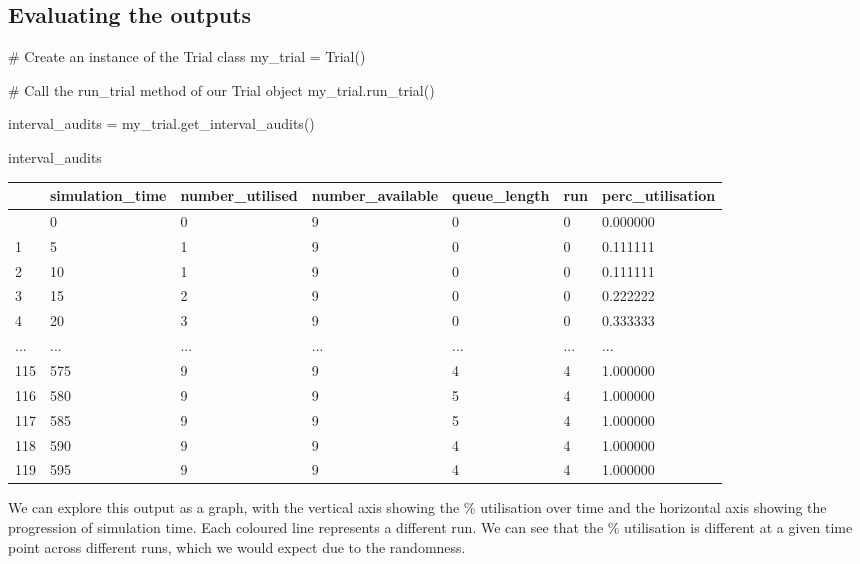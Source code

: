 \documentclass[
  letterpaper,
  DIV=11,
  numbers=noendperiod]{scrreprt}
\newenvironment{Shaded}{}{}
\newcommand{\CommentTok}[1]{\textcolor[rgb]{0.42,0.45,0.49}{#1}}
\newcommand{\NormalTok}[1]{\textcolor[rgb]{0.14,0.16,0.18}{#1}}
\newcommand{\OperatorTok}[1]{\textcolor[rgb]{0.14,0.16,0.18}{#1}}
\begin{document}
\subsection{Evaluating the outputs}\label{evaluating-the-outputs-7}

\begin{Shaded}
\begin{Highlighting}[]
\CommentTok{\# Create an instance of the Trial class}
\NormalTok{my\_trial }\OperatorTok{=}\NormalTok{ Trial()}

\CommentTok{\# Call the run\_trial method of our Trial object}
\NormalTok{my\_trial.run\_trial()}

\NormalTok{interval\_audits }\OperatorTok{=}\NormalTok{ my\_trial.get\_interval\_audits()}

\NormalTok{interval\_audits}
\end{Highlighting}
\end{Shaded}

\begin{longtable}[]{@{}lllllll@{}}
\toprule\noalign{}
& simulation\_time & number\_utilised & number\_available &
queue\_length & run & perc\_utilisation \\
\midrule\noalign{}
\endhead
\bottomrule\noalign{}
\endlastfoot
0 & 0 & 0 & 9 & 0 & 0 & 0.000000 \\
1 & 5 & 1 & 9 & 0 & 0 & 0.111111 \\
2 & 10 & 1 & 9 & 0 & 0 & 0.111111 \\
3 & 15 & 2 & 9 & 0 & 0 & 0.222222 \\
4 & 20 & 3 & 9 & 0 & 0 & 0.333333 \\
... & ... & ... & ... & ... & ... & ... \\
115 & 575 & 9 & 9 & 4 & 4 & 1.000000 \\
116 & 580 & 9 & 9 & 5 & 4 & 1.000000 \\
117 & 585 & 9 & 9 & 5 & 4 & 1.000000 \\
118 & 590 & 9 & 9 & 4 & 4 & 1.000000 \\
119 & 595 & 9 & 9 & 4 & 4 & 1.000000 \\
\end{longtable}

We can explore this output as a graph, with the vertical axis showing
the \% utilisation over time and the horizontal axis showing the
progression of simulation time. Each coloured line represents a
different run. We can see that the \% utilisation is different at a
given time point across different runs, which we would expect due to the
randomness.
\end{document}
